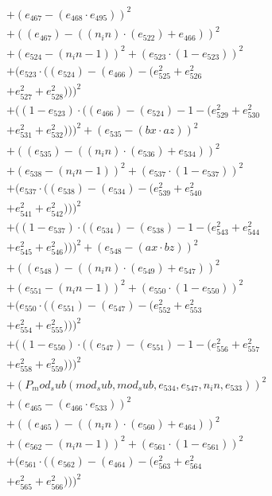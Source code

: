 \documentclass[10pt, a4paper]{article}
\begin{document}
\begin{align*}
& + (e_{467} - (e_{468}  \cdot  e_{495}))^{2} \\
& + ((e_{467}) - ((n_in)  \cdot  (e_{522}) + e_{466}))^{2} \\
& + (e_{524} - (n_in - 1))^{2} + (e_{523}  \cdot  (1 - e_{523}))^{2} \\
& + (e_{523}  \cdot  ((e_{524}) - (e_{466}) - (e_{525}^{2} + e_{526}^{2} \\
& + e_{527}^{2} + e_{528}^{2})))^{2} \\
& + ((1 - e_{523})  \cdot  ((e_{466}) - (e_{524}) - 1 - (e_{529}^{2} + e_{530}^{2} \\
& + e_{531}^{2} + e_{532}^{2})))^{2} + (e_{535} - (bx  \cdot  az))^{2} \\
& + ((e_{535}) - ((n_in)  \cdot  (e_{536}) + e_{534}))^{2} \\
& + (e_{538} - (n_in - 1))^{2} + (e_{537}  \cdot  (1 - e_{537}))^{2} \\
& + (e_{537}  \cdot  ((e_{538}) - (e_{534}) - (e_{539}^{2} + e_{540}^{2} \\
& + e_{541}^{2} + e_{542}^{2})))^{2} \\
& + ((1 - e_{537})  \cdot  ((e_{534}) - (e_{538}) - 1 - (e_{543}^{2} + e_{544}^{2} \\
& + e_{545}^{2} + e_{546}^{2})))^{2} + (e_{548} - (ax  \cdot  bz))^{2} \\
& + ((e_{548}) - ((n_in)  \cdot  (e_{549}) + e_{547}))^{2} \\
& + (e_{551} - (n_in - 1))^{2} + (e_{550}  \cdot  (1 - e_{550}))^{2} \\
& + (e_{550}  \cdot  ((e_{551}) - (e_{547}) - (e_{552}^{2} + e_{553}^{2} \\
& + e_{554}^{2} + e_{555}^{2})))^{2} \\
& + ((1 - e_{550})  \cdot  ((e_{547}) - (e_{551}) - 1 - (e_{556}^{2} + e_{557}^{2} \\
& + e_{558}^{2} + e_{559}^{2})))^{2} \\
& + (P_mod_sub(mod_sub, mod_sub, e_{534}, e_{547}, n_in, e_{533}))^{2} \\
& + (e_{465} - (e_{466}  \cdot  e_{533}))^{2} \\
& + ((e_{465}) - ((n_in)  \cdot  (e_{560}) + e_{464}))^{2} \\
& + (e_{562} - (n_in - 1))^{2} + (e_{561}  \cdot  (1 - e_{561}))^{2} \\
& + (e_{561}  \cdot  ((e_{562}) - (e_{464}) - (e_{563}^{2} + e_{564}^{2} \\
& + e_{565}^{2} + e_{566}^{2})))^{2} \\

\end{align*}
\end{document}
